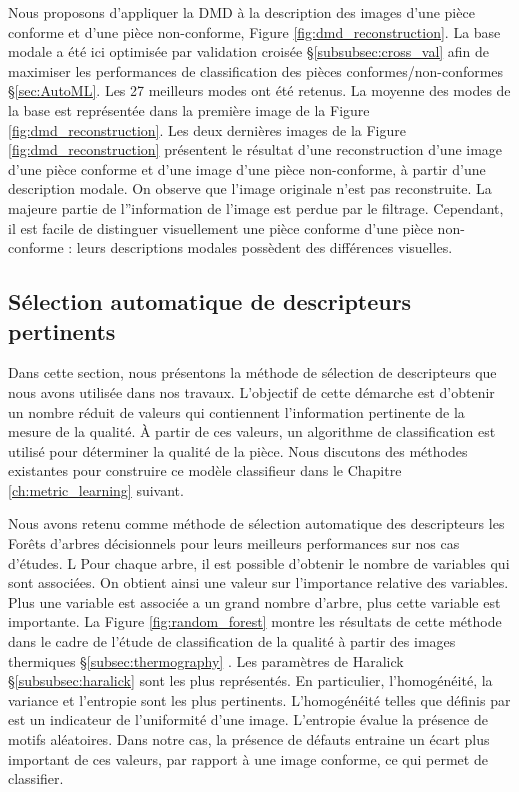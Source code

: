 Nous proposons d'appliquer la DMD à la description des images d'une pièce conforme et d'une pièce non-conforme, Figure \ref{fig:dmd_reconstruction}.
La base modale a été ici optimisée par validation croisée §\ref{subsubsec:cross_val} afin de maximiser les performances de classification des pièces conformes/non-conformes §\ref{sec:AutoML}.
Les 27 meilleurs modes ont été retenus.
La moyenne des modes de la base est représentée dans la première image de la Figure \ref{fig:dmd_reconstruction}.
Les deux dernières images de la Figure \ref{fig:dmd_reconstruction} présentent le résultat d'une reconstruction d'une image d'une pièce conforme et d'une image d'une pièce non-conforme, à partir d'une description modale.
On observe que l'image originale n'est pas reconstruite.
La majeure partie de l''information de l'image est perdue par le filtrage.
Cependant, il est facile de distinguer visuellement une pièce conforme d'une pièce non-conforme : leurs descriptions modales possèdent des différences visuelles.

\subsection{Sélection automatique de descripteurs pertinents} \label{subsec:features_selection}
Dans cette section, nous présentons la méthode de sélection de descripteurs que nous avons utilisée dans nos travaux.
L'objectif de cette démarche est d'obtenir un nombre réduit de valeurs qui contiennent l'information pertinente de la mesure de la qualité.
À partir de ces valeurs, un algorithme de classification est utilisé pour déterminer la qualité de la pièce.
Nous discutons des méthodes existantes pour construire ce modèle classifieur dans le Chapitre \ref{ch:metric_learning} suivant.

Nous avons retenu comme méthode de sélection automatique des descripteurs les Forêts d'arbres décisionnels pour leurs meilleurs performances sur nos cas d'études.
L%
Pour chaque arbre, il est possible d'obtenir le nombre de variables qui sont associées.
On obtient ainsi une valeur sur l'importance relative des variables.
Plus une variable est associée a un grand nombre d'arbre, plus cette variable est importante.
La Figure \ref{fig:random_forest} montre les résultats de cette méthode dans le cadre de l'étude de classification de la qualité à partir des images thermiques §\ref{subsec:thermography} \cite{nagorny_quality_2017}.
Les paramètres de Haralick §\ref{subsubsec:haralick} sont les plus représentés.
En particulier, l'homogénéité, la variance et l'entropie sont les plus pertinents.
L'homogénéité telles que définis par \citeauthor{haralick_textural_1973} est un indicateur de l'uniformité d'une image.
L'entropie évalue la présence de motifs aléatoires.
Dans notre cas, la présence de défauts entraine un écart plus important de ces valeurs, par rapport à une image conforme, ce qui permet de classifier.

